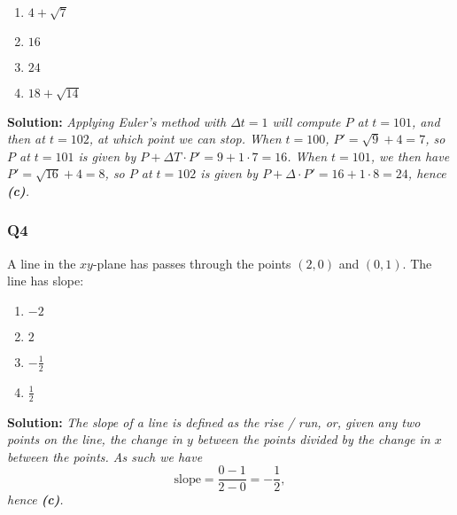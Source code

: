\documentclass[a4paper,12pt]{article}
\begin{document}
\begin{enumerate}[label=(\alph*)]
\item $4 + \sqrt{7}$
\item $16$
\item $24$
\item $18 + \sqrt{14}$
\end{enumerate}

\textbf{Solution:} \emph{Applying Euler's method with $\Delta t = 1$ will compute $P$ at $t=101$, and then at $t=102$, at which point we can stop. When $t=100$, $P' = \sqrt{9} + 4 = 7$, so $P$ at $t=101$ is given by $P + \Delta T \cdot P' = 9 + 1 \cdot 7 = 16$. When $t=101$, we then have $P' = \sqrt{16} + 4 = 8$, so $P$ at $t=102$ is given by $P + \Delta \cdot P' = 16 + 1 \cdot 8 = 24$, hence \textbf{(c)}.}

\subsubsection*{Q4}
A line in the $xy$-plane has passes through the points $(2,0)$ and $(0,1)$. The line has slope:
\begin{enumerate}[label=(\alph*)]
\item $-2$
\item $2$
\item $-\frac{1}{2}$
\item $\frac{1}{2}$
\end{enumerate}

\textbf{Solution:} \emph{The slope of a line is defined as the rise / run, or, given any two points on the line, the change in $y$ between the points divided by the change in $x$ between the points. As such we have}
\[
	\text{slope} = \frac{0 - 1}{2 - 0} = -\frac{1}{2},
\]
\emph{hence \textbf{(c)}.}
\end{document}
